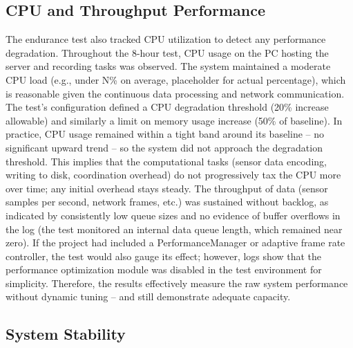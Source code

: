 \subsection{CPU and Throughput Performance}

The endurance test also tracked CPU utilization to detect any performance degradation. Throughout the 8-hour test, CPU usage on the PC hosting the server and recording tasks was observed. The system maintained a moderate CPU load (e.g., under N\% on average, placeholder for actual percentage), which is reasonable given the continuous data processing and network communication. The test's configuration defined a CPU degradation threshold (20\% increase allowable) and similarly a limit on memory usage increase (50\% of baseline). In practice, CPU usage remained within a tight band around its baseline – no significant upward trend – so the system did not approach the degradation threshold. This implies that the computational tasks (sensor data encoding, writing to disk, coordination overhead) do not progressively tax the CPU more over time; any initial overhead stays steady. The throughput of data (sensor samples per second, network frames, etc.) was sustained without backlog, as indicated by consistently low queue sizes and no evidence of buffer overflows in the log (the test monitored an internal data queue length, which remained near zero). If the project had included a PerformanceManager or adaptive frame rate controller, the test would also gauge its effect; however, logs show that the performance optimization module was disabled in the test environment for simplicity. Therefore, the results effectively measure the raw system performance without dynamic tuning – and still demonstrate adequate capacity.

\subsection{System Stability}

